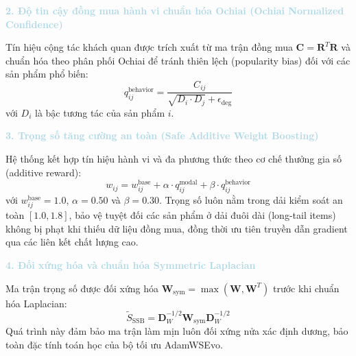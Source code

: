 \medskip
\noindent\textcolor{lightblue}{\textbf{2. Độ tin cậy đồng mua hành vi chuẩn hóa Ochiai (Ochiai Normalized Confidence)}}

Tín hiệu cộng tác khách quan được trích xuất từ ma trận đồng mua $\mathbf{C} = \mathbf{R}^T \mathbf{R}$ và chuẩn hóa theo phân phối Ochiai để tránh thiên lệch (popularity bias) đối với các sản phẩm phổ biến:
\begin{equation}
q_{ij}^{\text{behavior}} = \frac{C_{ij}}{\sqrt{D_i \cdot D_j} + \epsilon_{\text{deg}}}
\end{equation}
với $D_i$ là bậc tương tác của sản phẩm $i$.

\medskip
\noindent\textcolor{lightblue}{\textbf{3. Trọng số tăng cường an toàn (Safe Additive Weight Boosting)}}

Hệ thống kết hợp tín hiệu hành vi và đa phương thức theo cơ chế thưởng gia số (additive reward):
\begin{equation}
w_{ij} = w_{ij}^{\text{base}} + \alpha \cdot q_{ij}^{\text{modal}} + \beta \cdot q_{ij}^{\text{behavior}}
\end{equation}
với $w_{ij}^{\text{base}} = 1.0$, $\alpha = 0.50$ và $\beta = 0.30$. Trọng số luôn nằm trong dải kiểm soát an toàn $[1.0, 1.8]$, bảo vệ tuyệt đối các sản phẩm ở dải đuôi dài (long-tail items) không bị phạt khi thiếu dữ liệu đồng mua, đồng thời ưu tiên truyền dẫn gradient qua các liên kết chất lượng cao.

\medskip
\noindent\textcolor{lightblue}{\textbf{4. Đối xứng hóa và chuẩn hóa Symmetric Laplacian}}

Ma trận trọng số được đối xứng hóa $\mathbf{W}_{\text{sym}} = \max(\mathbf{W}, \mathbf{W}^T)$ trước khi chuẩn hóa Laplacian:
\begin{equation}
\tilde{S}_{\text{SSB}} = \mathbf{D}_W^{-1/2} \mathbf{W}_{\text{sym}} \mathbf{D}_W^{-1/2}
\end{equation}
Quá trình này đảm bảo ma trận làm mịn luôn đối xứng nửa xác định dương, bảo toàn đặc tính toán học của bộ tối ưu AdamWSEvo.


